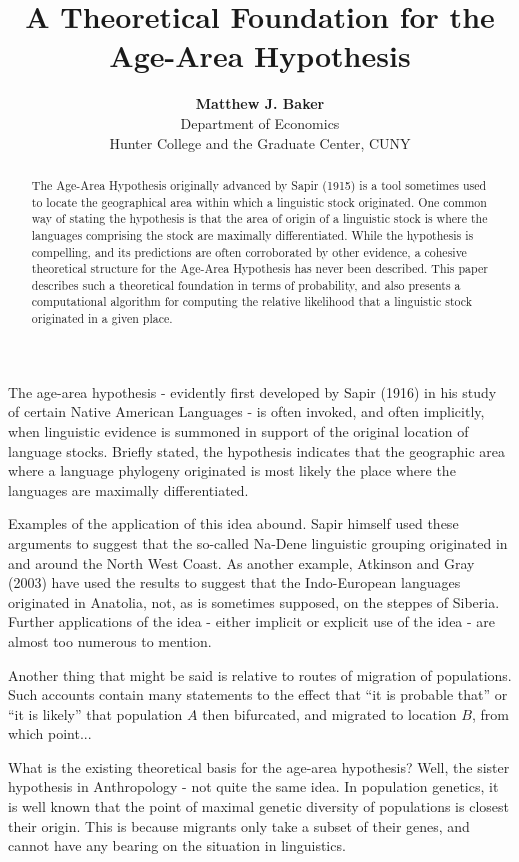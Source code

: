 \documentclass[11pt]{article}
\title{A Theoretical Foundation for the Age-Area Hypothesis}
\author{\textbf{Matthew J. Baker} \\ Department of Economics \\ Hunter College and the Graduate Center, CUNY}
\begin{document}
\maketitle
\begin{abstract}
\noindent The Age-Area Hypothesis originally advanced by Sapir (1915) is a tool sometimes used to locate the geographical area within which a linguistic stock originated. One common way of stating the hypothesis
is that the area of origin of a linguistic stock is where the languages comprising the stock are maximally differentiated. While the hypothesis is compelling, and its predictions are often corroborated by other evidence, a cohesive theoretical structure for the Age-Area Hypothesis has never been described. This paper describes such a theoretical foundation in terms of probability, and also presents a computational algorithm for computing the relative likelihood that a linguistic stock originated in a given place.
\end{abstract}
\newpage

The age-area hypothesis - evidently first developed by Sapir (1916) in his study of certain Native American Languages - is often invoked, and often implicitly, when linguistic
evidence is summoned in support of the original location of language stocks. Briefly stated, the hypothesis indicates that the geographic area where a language phylogeny originated
is most likely the place where the languages are maximally differentiated.

Examples of the application of this idea abound. Sapir himself used these arguments to suggest that the so-called Na-Dene linguistic grouping originated in and around the North West Coast. As another example, Atkinson and Gray (2003) have used the results to suggest that the Indo-European languages originated in Anatolia, not, as is sometimes supposed, on the steppes of Siberia. Further applications of the idea - either implicit or explicit use of the idea - are almost too numerous to mention.

Another thing that might be said is relative to routes of migration of populations. Such accounts contain many statements to the effect that ``it is probable that'' or ``it is likely'' that population $A$ then bifurcated, and migrated to location $B$, from which point...

What is the existing theoretical basis for the age-area hypothesis? Well, the sister hypothesis in Anthropology - not quite the same idea. In population genetics, it is well known that
the point of maximal genetic diversity of populations is closest their origin. This is because migrants only take a subset of their genes, and cannot have any bearing on the situation
in linguistics.
\end{document}
